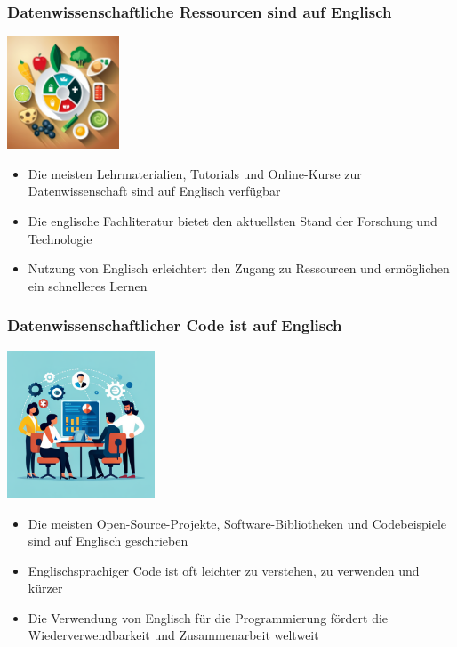 \documentclass{beamer}
\begin{document}
    \begin{frame}
        \frametitle{Datenwissenschaftliche Ressourcen sind auf Englisch}
        \begin{center}
            \includegraphics[width=0.25\textwidth]{figures/data-science-resources-english}
        \end{center}
        \begin{itemize}
            \item Die meisten Lehrmaterialien, Tutorials und Online-Kurse zur Datenwissenschaft sind auf Englisch verfügbar
            \item Die englische Fachliteratur bietet den aktuellsten Stand der Forschung und Technologie
            \item Nutzung von Englisch erleichtert den Zugang zu Ressourcen und ermöglichen ein schnelleres Lernen
        \end{itemize}
    \end{frame}
        
    \begin{frame}
        \frametitle{Datenwissenschaftlicher Code ist auf Englisch}
        \begin{center}
            \includegraphics[width=0.33\textwidth]{figures/healthcare-analytics.png}
        \end{center}
        \begin{itemize}
            \item Die meisten Open-Source-Projekte, Software-Bibliotheken und Codebeispiele sind auf Englisch geschrieben
            \item Englischsprachiger Code ist oft leichter zu verstehen, zu verwenden und kürzer
            \item Die Verwendung von Englisch für die Programmierung fördert die Wiederverwendbarkeit und Zusammenarbeit weltweit
        \end{itemize}
        
    \end{frame}
\end{document}
